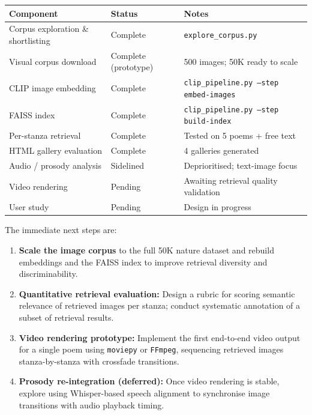 \documentclass[11pt,a4paper]{article}
\begin{document}
\begin{center}
\begin{tabular}{lll}
  \hline
  \textbf{Component} & \textbf{Status} & \textbf{Notes} \\
  \hline
  Corpus exploration \& shortlisting & Complete & \texttt{explore\_corpus.py} \\
  Visual corpus download             & Complete (prototype) & 500 images; 50K ready to scale \\
  CLIP image embedding               & Complete & \texttt{clip\_pipeline.py --step embed-images} \\
  FAISS index                        & Complete & \texttt{clip\_pipeline.py --step build-index} \\
  Per-stanza retrieval               & Complete & Tested on 5 poems + free text \\
  HTML gallery evaluation            & Complete & 4 galleries generated \\
  Audio / prosody analysis           & Sidelined & Deprioritised; text-image focus \\
  Video rendering                    & Pending  & Awaiting retrieval quality validation \\
  User study                         & Pending  & Design in progress \\
  \hline
\end{tabular}
\end{center}

\noindent The immediate next steps are:
\begin{enumerate}
  \item \textbf{Scale the image corpus} to the full 50K nature dataset and rebuild embeddings and the FAISS index to improve retrieval diversity and discriminability.
  \item \textbf{Quantitative retrieval evaluation:} Design a rubric for scoring semantic relevance of retrieved images per stanza; conduct systematic annotation of a subset of retrieval results.
  \item \textbf{Video rendering prototype:} Implement the first end-to-end video output for a single poem using \texttt{moviepy} or \texttt{FFmpeg}, sequencing retrieved images stanza-by-stanza with crossfade transitions.
  \item \textbf{Prosody re-integration (deferred):} Once video rendering is stable, explore using Whisper-based speech alignment to synchronise image transitions with audio playback timing.
\end{enumerate}
\end{document}
